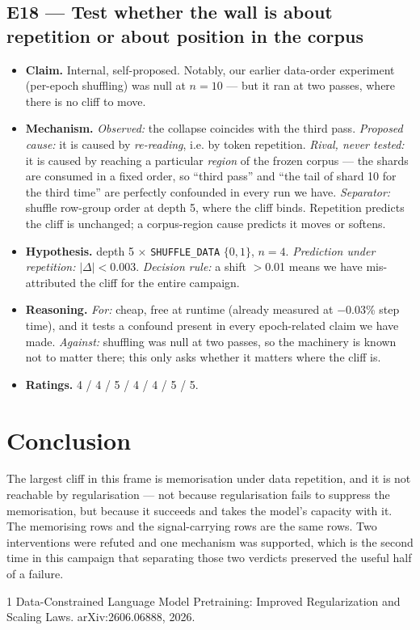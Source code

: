 \documentclass{article}
\begin{document}
\subsection{E18 --- Test whether the wall is about repetition or about position in the corpus}
\begin{itemize}\itemsep2pt
\item \textbf{Claim.} Internal, self-proposed. Notably, our earlier data-order experiment (per-epoch shuffling) was null at $n{=}10$ --- but it ran at two passes, where there is no cliff to move.
\item \textbf{Mechanism.} \emph{Observed:} the collapse coincides with the third pass. \emph{Proposed cause:} it is caused by \emph{re-reading}, i.e. by token repetition. \emph{Rival, never tested:} it is caused by reaching a particular \emph{region} of the frozen corpus --- the shards are consumed in a fixed order, so ``third pass'' and ``the tail of shard 10 for the third time'' are perfectly confounded in every run we have. \emph{Separator:} shuffle row-group order at depth 5, where the cliff binds. Repetition predicts the cliff is unchanged; a corpus-region cause predicts it moves or softens.
\item \textbf{Hypothesis.} depth 5 $\times$ \texttt{SHUFFLE\_DATA} $\{0,1\}$, $n{=}4$. \emph{Prediction under repetition:} $|\Delta| < 0.003$. \emph{Decision rule:} a shift $>$0.01 means we have mis-attributed the cliff for the entire campaign.
\item \textbf{Reasoning.} \emph{For:} cheap, free at runtime (already measured at $-0.03$\% step time), and it tests a confound present in every epoch-related claim we have made. \emph{Against:} shuffling was null at two passes, so the machinery is known not to matter there; this only asks whether it matters where the cliff is.
\item \textbf{Ratings.} 4 / 4 / 5 / 4 / 4 / 5 / 5.
\end{itemize}

\section{Conclusion}
The largest cliff in this frame is memorisation under data repetition, and it is not reachable by regularisation --- not because regularisation fails to suppress the memorisation, but because it succeeds and takes the model's capacity with it. The memorising rows and the signal-carrying rows are the same rows. Two interventions were refuted and one mechanism was supported, which is the second time in this campaign that separating those two verdicts preserved the useful half of a failure.


\begin{thebibliography}{1}
Data-Constrained Language Model Pretraining: Improved Regularization and Scaling Laws.
\newblock arXiv:2606.06888, 2026.
\end{thebibliography}
\end{document}
